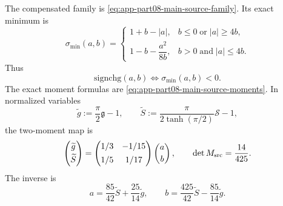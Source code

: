 The compensated family is \cref{eq:app-part08-main-source-family}.  Its exact minimum is
\begin{equation}
\label{eq:app-part08-stage246-sigma-min}
\sigma_{\min}(a,b)=
\begin{cases}
1+b-|a|, & b\le0\;\text{or}\; |a|\ge4b,\\[4pt]
1-b-\dfrac{a^2}{8b}, & b>0\;\text{and}\; |a|\le4b.
\end{cases}
\end{equation}
Thus
\begin{equation}
\label{eq:app-part08-stage246-sign-change}
\mathrm{signchg}(a,b)\iff \sigma_{\min}(a,b)<0.
\end{equation}
The exact moment formulas are \cref{eq:app-part08-main-source-moments}.  In normalized variables
\begin{equation}
\label{eq:app-part08-stage246-normalized-source-moments}
\widetilde g:=\frac\pi2\mathfrak g-1,
\qquad
\widetilde S:=\frac{\pi}{2\tanh(\pi/2)}\mathcal S-1,
\end{equation}
the two-moment map is
\begin{equation}
\label{eq:app-part08-stage246-matrix}
\begin{pmatrix}
\widetilde g\\[2pt]
\widetilde S
\end{pmatrix}
=
\begin{pmatrix}
1/3 & -1/15\\[4pt]
1/5 & 1/17
\end{pmatrix}
\begin{pmatrix}
a\\[2pt]
b
\end{pmatrix},
\qquad
\det M_{\rm src}=\frac{14}{425}.
\end{equation}
The inverse is
\begin{equation}
\label{eq:app-part08-stage246-inverse-source-map}
a=\frac{85}{42}\widetilde S+\frac{25}{14}\widetilde g,
\qquad
b=\frac{425}{42}\widetilde S-\frac{85}{14}\widetilde g.
\end{equation}

